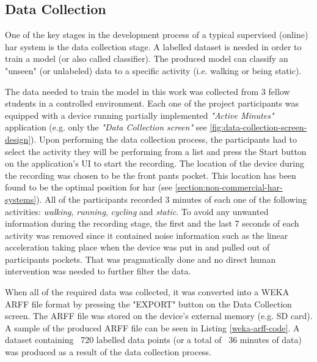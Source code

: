     \subsection{Data Collection}
    One of the key stages in the development process of a typical supervised (online) \gls{har} system is the data collection stage. A labelled dataset is needed in order to train a model (or also called classifier). The produced model can classify an "unseen" (or unlabeled) data to a specific activity (i.e. walking or being static).
    
    The data needed to train the model in this work was collected from 3 fellow students in a controlled environment. Each one of the project participants was equipped with a device running partially implemented \textit{"Active Minutes"} application (e.g. only the \textit{"Data Collection screen"} see \ref{fig:data-collection-screen-design}). Upon performing the data collection process, the participants had to select the activity they will be performing from a list and press the Start button on the application's UI to start the recording. The location of the device during the recording was chosen to be the front pants pocket. This location has been found to be the optimal position for \gls{har} (see \ref{section:non-commercial-har-systems}). All of the participants recorded 3 minutes of each one of the following activities: \textit{walking}, \textit{running}, \textit{cycling} and \textit{static}. To avoid any unwanted information during the recording stage, the first and the last 7 seconds of each activity was removed since it contained noise information such as the linear acceleration taking place when the device was put in and pulled out of participants pockets. That was pragmatically done and no direct human intervention was needed to further filter the data.
    
    When all of the required data was collected, it was converted into a WEKA ARFF file format by pressing the "EXPORT" button on the Data Collection screen. The ARFF file was stored on the device's external memory (e.g. SD card). A sample of the produced ARFF file can be seen in Listing \ref{weka-arff-code}. A dataset containing ~720 labelled data points (or a total of ~36 minutes of data) was produced as a result of the data collection process. 
    
   
    
